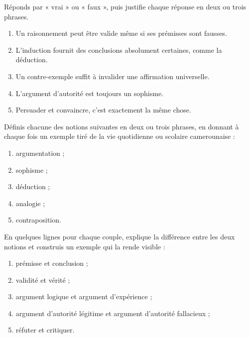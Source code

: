\documentclass[11pt]{article}
\newcounter{popsec}
\newcounter{popsub}
\newcommand{\courssub}[1]{%
  \stepcounter{popsub}%
  \par\vspace{9pt}\noindent{\popxbold\fontsize{11.5}{13}\selectfont\color{popink}{\color{poporange}\thepopsec.\thepopsub}\hspace{6pt}#1}\par\nopagebreak\vspace{4pt}
}
\begin{document}
\begin{exercice}
Réponds par « vrai » ou « faux », puis justifie chaque réponse en deux ou trois phrases.
\begin{enumerate}
\item Un raisonnement peut être valide même si ses prémisses sont fausses.
\item L'induction fournit des conclusions absolument certaines, comme la déduction.
\item Un contre-exemple suffit à invalider une affirmation universelle.
\item L'argument d'autorité est toujours un sophisme.
\item Persuader et convaincre, c'est exactement la même chose.
\end{enumerate}
\end{exercice}

\begin{exercice}
Définis chacune des notions suivantes en deux ou trois phrases, en donnant à chaque fois un exemple tiré de la vie quotidienne ou scolaire camerounaise :
\begin{enumerate}
\item argumentation ;
\item sophisme ;
\item déduction ;
\item analogie ;
\item contraposition.
\end{enumerate}
\end{exercice}

\begin{exercice}
En quelques lignes pour chaque couple, explique la différence entre les deux notions et construis un exemple qui la rende visible :
\begin{enumerate}
\item prémisse et conclusion ;
\item validité et vérité ;
\item argument logique et argument d'expérience ;
\item argument d'autorité légitime et argument d'autorité fallacieux ;
\item réfuter et critiquer.
\end{enumerate}
\end{exercice}

\courssub{Je m'entraîne}
\end{document}
